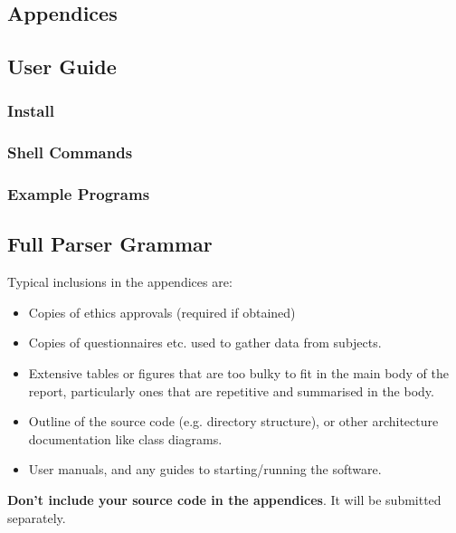 \documentclass{l4proj}
\begin{document}
\begin{appendices}

\chapter{Appendices}

\section{User Guide}
\subsection{Install}
\subsection{Shell Commands}
\subsection{Example Programs}
\section{Full Parser Grammar}

Typical inclusions in the appendices are:

\begin{itemize}
\item
  Copies of ethics approvals (required if obtained)
\item
  Copies of questionnaires etc. used to gather data from subjects.
\item
  Extensive tables or figures that are too bulky to fit in the main body of
  the report, particularly ones that are repetitive and summarised in the body.

\item Outline of the source code (e.g. directory structure), or other architecture documentation like class diagrams.

\item User manuals, and any guides to starting/running the software.

\end{itemize}

\textbf{Don't include your source code in the appendices}. It will be
submitted separately.

\end{appendices}






\end{document}

